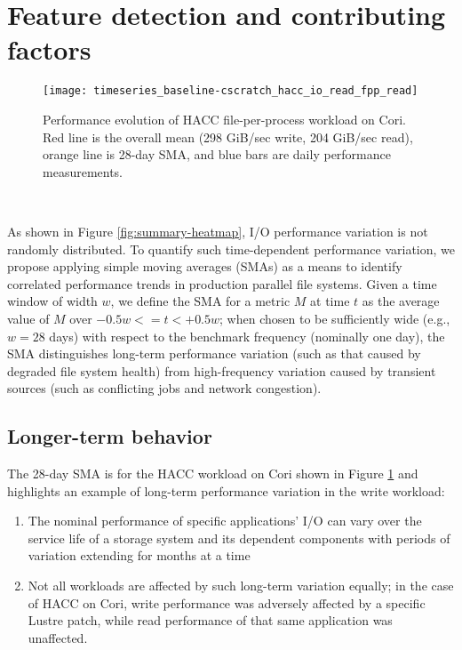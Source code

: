 \section{Feature detection and contributing factors}  \label{sec:features}

\begin{figure}[t]
    \centering
    \texttt{[image: timeseries\_baseline-cscratch\_hacc\_io\_read\_fpp\_read]}
    \vspace{-.35in}
    \caption{Performance evolution of HACC file-per-process  workload on Cori.  Red line is the overall mean (298 GiB/sec write, 204 GiB/sec read), orange line is 28-day SMA, and blue bars are daily performance measurements.}
    \label{fig:timeseries_baseline}
\end{figure}\

As shown in Figure \ref{fig:summary-heatmap}, I/O performance variation is not randomly distributed.  To quantify such time-dependent performance variation, we propose applying simple moving averages (SMAs) as a means to identify correlated performance trends in production parallel file systems.
Given a time window of width $w$, we define the SMA for a metric $M$ at time $t$ as the average value of $M$ over $-0.5w <= t < +0.5w$;
when chosen to be sufficiently wide (e.g., $w = 28$ days) with respect to the benchmark frequency (nominally one day), the SMA distinguishes long-term performance variation (such as that caused by degraded file system health) from high-frequency variation caused by transient sources (such as conflicting jobs and network congestion).

\subsection{Longer-term behavior} \label{sec:features/longterm}



The 28-day SMA is for the HACC workload on Cori shown in Figure \ref{fig:timeseries_baseline} and highlights an example of long-term performance variation in the write workload:

\begin{enumerate}
\item The nominal performance of specific applications' I/O can vary over the service life of a storage system and its dependent components with periods of variation extending for months at a time
\item Not all workloads are affected by such long-term variation equally; in the case of HACC on Cori, write performance was adversely affected by a specific Lustre patch, while read performance of that same application was unaffected.
\end{enumerate}

